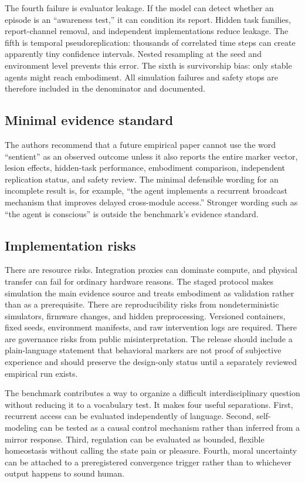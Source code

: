 \documentclass[conference]{IEEEtran}
\begin{document}
The fourth failure is evaluator leakage. If the model can detect whether an episode is an “awareness test,” it can condition its report. Hidden task families, report-channel removal, and independent implementations reduce leakage. The fifth is temporal pseudoreplication: thousands of correlated time steps can create apparently tiny confidence intervals. Nested resampling at the seed and environment level prevents this error. The sixth is survivorship bias: only stable agents might reach embodiment. All simulation failures and safety stops are therefore included in the denominator and documented.

\subsection{Minimal evidence standard}

The authors recommend that a future empirical paper cannot use the word ``sentient'' as an observed outcome unless it also reports the entire marker vector, lesion effects, hidden-task performance, embodiment comparison, independent replication status, and safety review. The minimal defensible wording for an incomplete result is, for example, “the agent implements a recurrent broadcast mechanism that improves delayed cross-module access.” Stronger wording such as “the agent is conscious” is outside the benchmark's evidence standard.

\subsection{Implementation risks}

There are resource risks. Integration proxies can dominate compute, and physical transfer can fail for ordinary hardware reasons. The staged protocol makes simulation the main evidence source and treats embodiment as validation rather than as a prerequisite. There are reproducibility risks from nondeterministic simulators, firmware changes, and hidden preprocessing. Versioned containers, fixed seeds, environment manifests, and raw intervention logs are required. There are governance risks from public misinterpretation. The release should include a plain-language statement that behavioral markers are not proof of subjective experience and should preserve the design-only status until a separately reviewed empirical run exists.

The benchmark contributes a way to organize a difficult interdisciplinary question without reducing it to a vocabulary test. It makes four useful separations. First, recurrent access can be evaluated independently of language. Second, self-modeling can be tested as a causal control mechanism rather than inferred from a mirror response. Third, regulation can be evaluated as bounded, flexible homeostasis without calling the state pain or pleasure. Fourth, moral uncertainty can be attached to a preregistered convergence trigger rather than to whichever output happens to sound human.
\end{document}
